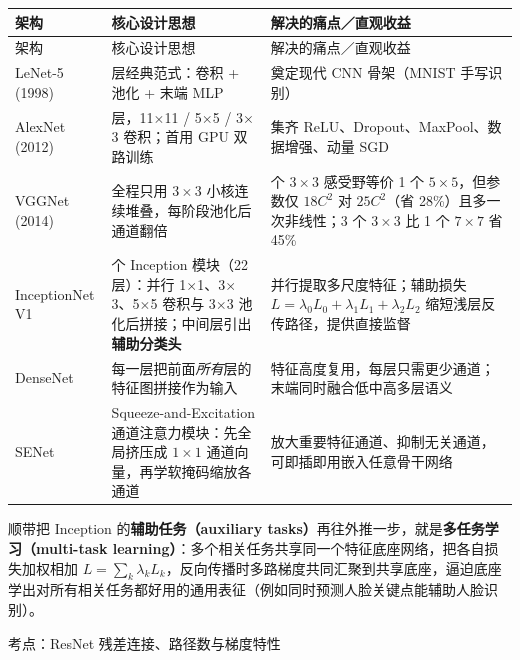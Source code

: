 \begingroup\small\setlength{\tabcolsep}{3pt}\renewcommand{\arraystretch}{1.22}
\begin{longtable}{@{}>{\raggedright\arraybackslash}p{}>{\raggedright\arraybackslash}p{}>{\raggedright\arraybackslash}p{}@{}}
\toprule
架构 & 核心设计思想 & 解决的痛点／直观收益 \\
\midrule\endfirsthead
架构 & 核心设计思想 & 解决的痛点／直观收益 \\
\midrule\endhead
\bottomrule\endfoot
LeNet-5 (1998) & 7 层经典范式：卷积 + 池化 + 末端 MLP & 奠定现代 CNN 骨架（MNIST 手写识别） \\
AlexNet (2012) & 14 层，11\ensuremath{\times}11 / 5\ensuremath{\times}5 / 3\ensuremath{\times}3 卷积；首用 GPU 双路训练 & 集齐 ReLU、Dropout、MaxPool、数据增强、动量 SGD \\
VGGNet (2014) & 全程只用 $3\times 3$ 小核连续堆叠，每阶段池化后通道翻倍 & 2 个 $3\times 3$ 感受野等价 1 个 $5\times 5$，但参数仅 $18C^2$ 对 $25C^2$（省 28\%）且多一次非线性；3 个 $3\times 3$ 比 1 个 $7\times 7$ 省 45\% \\
InceptionNet V1 & 9 个 Inception 模块（22 层）：并行 1\ensuremath{\times}1、3\ensuremath{\times}3、5\ensuremath{\times}5 卷积与 3\ensuremath{\times}3 池化后拼接；中间层引出\textbf{辅助分类头} & 并行提取多尺度特征；辅助损失 $L=\lambda_0 L_0+\lambda_1 L_1+\lambda_2 L_2$ 缩短浅层反传路径，提供直接监督 \\
DenseNet & 每一层把前面\emph{所有}层的特征图拼接作为输入 & 特征高度复用，每层只需更少通道；末端同时融合低中高多层语义 \\
SENet & Squeeze-and-Excitation 通道注意力模块：先全局挤压成 $1\times 1$ 通道向量，再学软掩码缩放各通道 & 放大重要特征通道、抑制无关通道，可即插即用嵌入任意骨干网络 \\
\end{longtable}\endgroup

顺带把 Inception 的\textbf{辅助任务（auxiliary tasks）}再往外推一步，就是\textbf{多任务学习（multi-task learning）}：多个相关任务共享同一个特征底座网络，把各自损失加权相加 $L = \sum_k \lambda_k L_k$，反向传播时多路梯度共同汇聚到共享底座，逼迫底座学出对所有相关任务都好用的通用表征（例如同时预测人脸关键点能辅助人脸识别）。


考点：ResNet 残差连接、路径数与梯度特性 

